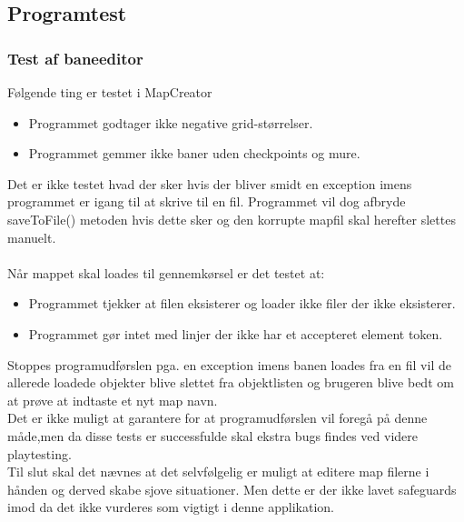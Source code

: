 \subsection{Programtest}


\subsubsection{Test af baneeditor}
Følgende ting er testet i MapCreator
\begin{itemize}
\item Programmet godtager ikke negative grid-størrelser.
\item Programmet gemmer ikke baner uden checkpoints og mure.
\end{itemize}

Det er ikke testet hvad der sker hvis der bliver smidt en exception imens programmet er igang til at skrive til en fil. Programmet vil dog afbryde saveToFile() metoden hvis dette sker og den korrupte mapfil skal herefter slettes manuelt.\\
\\
Når mappet skal loades til gennemkørsel er det testet at:
\begin{itemize}
\item Programmet tjekker at filen eksisterer og loader ikke filer der ikke eksisterer.
\item Programmet gør intet med linjer der ikke har et accepteret element token.
\end{itemize}
Stoppes programudførslen pga. en exception imens banen loades fra en fil vil de allerede loadede objekter blive slettet fra objektlisten og brugeren blive bedt om at prøve at indtaste et nyt map navn.\\
Det er ikke muligt at garantere for at programudførslen vil foregå på denne måde,men da disse tests er successfulde skal ekstra bugs findes ved videre playtesting.
\\
Til slut skal det nævnes at det selvfølgelig er muligt at editere map filerne i hånden og derved skabe sjove situationer. Men dette er der ikke lavet safeguards imod da det ikke vurderes som vigtigt i denne applikation.
